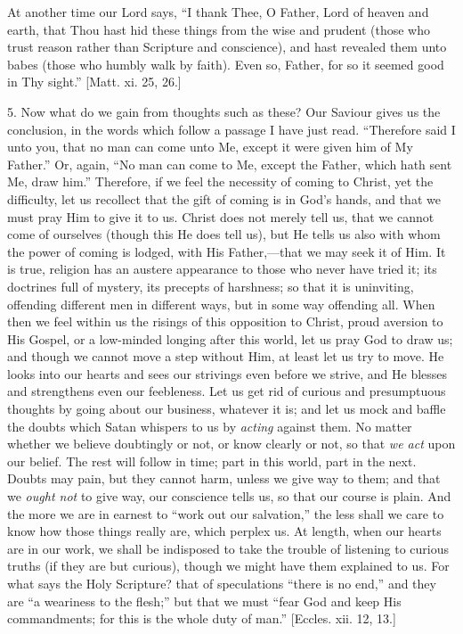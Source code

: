 At another time our Lord says, ``I thank Thee, O
Father, Lord of heaven and earth, that Thou hast hid
these things from the wise and prudent (those who trust
reason rather than Scripture and conscience), and hast
revealed them unto babes (those who humbly walk by
faith). Even so, Father, for so it seemed good in Thy
sight.'' [Matt. xi. 25, 26.]

5. Now what do we gain from thoughts such as these?
Our Saviour gives us the conclusion, in the words which
follow a passage I have just read. ``Therefore said I
unto you, that no man can come unto Me, except it were
given him of My Father.'' Or, again, ``No man can
come to Me, except the Father, which hath sent Me, draw
him.'' Therefore, if we feel the necessity of coming
to Christ, yet the difficulty, let us recollect that the
gift of coming is in God's hands, and that we must pray
Him to give it to us. Christ does not merely tell us,
that we cannot come of ourselves (though this He does
tell us), but He tells us also with whom the power of
coming is lodged, with His Father,—that we may seek
it of Him. It is true, religion has an austere appearance
to those who never have tried it; its doctrines full of
mystery, its precepts of harshness; so that it is
uninviting, offending different men in different ways,
but in some way offending all. When then we feel within
us the risings of this opposition to Christ, proud
aversion to His Gospel, or a low-minded longing after
this world, let us pray God to draw us; and though we
cannot move a step without Him, at least let us try to
move. He looks into our hearts and sees our strivings
even before we strive, and He blesses and strengthens
even our feebleness. Let us get rid of curious and
presumptuous thoughts by going about our business,
whatever it is; and let us mock and baffle the doubts
which Satan whispers to us by \emph{acting} against
them. No matter whether we believe doubtingly or not, or
know clearly or not, so that \emph{we act} upon our
belief. The rest will follow in time; part in this world,
part in the next. Doubts may pain, but they cannot harm,
unless we give way to them; and that we \emph{ought not}
to give way, our conscience tells us, so that our course
is plain. And the more we are in earnest to ``work
out our salvation,'' the less shall we care to know
how those things really are, which perplex us. At length,
when our hearts are in our work, we shall be indisposed
to take the trouble of listening to curious truths (if
they are but curious), though we might have them
explained to us. For what says the Holy Scripture? that
of speculations ``there is no end,'' and they are
``a weariness to the flesh;'' but that we must
``fear God and keep His commandments; for this is the
whole duty of man.'' [Eccles. xii. 12, 13.]

